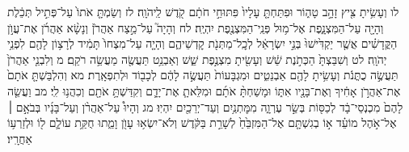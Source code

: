 \documentclass[twoside, openany, parskip=half, 11pt]{book}
\begin{document}
לו וְעָשִׂ֥יתָ צִּ֖יץ זָהָ֣ב טָה֑וֹר וּפִתַּחְתָּ֤ עָלָיו֙ פִּתּוּחֵ֣י חֹתָ֔ם קֹ֖דֶשׁ לַֽיהֹוָֽה׃ לז וְשַׂמְתָּ֤ אֹתוֹ֙ עַל־פְּתִ֣יל תְּכֵ֔לֶת וְהָיָ֖ה עַל־הַמִּצְנָ֑פֶת אֶל־מ֥וּל פְּנֵֽי־הַמִּצְנֶ֖פֶת יִהְיֶֽה׃ לח וְהָיָה֮ עַל־מֵ֣צַח אַהֲרֹן֒ וְנָשָׂ֨א אַהֲרֹ֜ן אֶת־עֲוֺ֣ן הַקֳּדָשִׁ֗ים אֲשֶׁ֤ר יַקְדִּ֙ישׁוּ֙ בְּנֵ֣י יִשְׂרָאֵ֔ל לְכׇֽל־מַתְּנֹ֖ת קׇדְשֵׁיהֶ֑ם וְהָיָ֤ה עַל־מִצְחוֹ֙ תָּמִ֔יד לְרָצ֥וֹן לָהֶ֖ם לִפְנֵ֥י יְהֹוָֽה׃ לט וְשִׁבַּצְתָּ֙ הַכְּתֹ֣נֶת שֵׁ֔שׁ וְעָשִׂ֖יתָ מִצְנֶ֣פֶת שֵׁ֑שׁ וְאַבְנֵ֥ט תַּעֲשֶׂ֖ה מַעֲשֵׂ֥ה רֹקֵֽם׃ מ וְלִבְנֵ֤י אַהֲרֹן֙ תַּעֲשֶׂ֣ה כֻתֳּנֹ֔ת וְעָשִׂ֥יתָ לָהֶ֖ם אַבְנֵטִ֑ים וּמִגְבָּעוֹת֙ תַּעֲשֶׂ֣ה לָהֶ֔ם לְכָב֖וֹד וּלְתִפְאָֽרֶת׃ מא וְהִלְבַּשְׁתָּ֤ אֹתָם֙ אֶת־אַהֲרֹ֣ן אָחִ֔יךָ וְאֶת־בָּנָ֖יו אִתּ֑וֹ וּמָשַׁחְתָּ֨ אֹתָ֜ם וּמִלֵּאתָ֧ אֶת־יָדָ֛ם וְקִדַּשְׁתָּ֥ אֹתָ֖ם וְכִהֲנ֥וּ לִֽי׃ מב וַעֲשֵׂ֤ה לָהֶם֙ מִכְנְסֵי־בָ֔ד לְכַסּ֖וֹת בְּשַׂ֣ר עֶרְוָ֑ה מִמׇּתְנַ֥יִם וְעַד־יְרֵכַ֖יִם יִהְיֽוּ׃ מג וְהָיוּ֩ עַל־אַהֲרֹ֨ן וְעַל־בָּנָ֜יו בְּבֹאָ֣ם ׀ אֶל־אֹ֣הֶל מוֹעֵ֗ד א֣וֹ בְגִשְׁתָּ֤ם אֶל־הַמִּזְבֵּ֙חַ֙ לְשָׁרֵ֣ת בַּקֹּ֔דֶשׁ וְלֹא־יִשְׂא֥וּ עָוֺ֖ן וָמֵ֑תוּ חֻקַּ֥ת עוֹלָ֛ם ל֖וֹ וּלְזַרְע֥וֹ אַחֲרָֽיו׃
\end{document}
